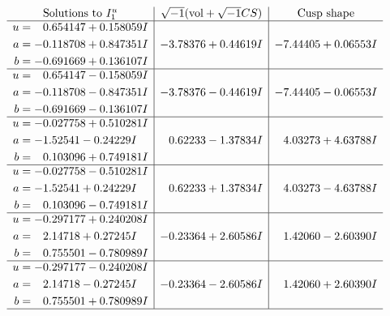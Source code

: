 \documentclass[1p]{elsarticle_modified}
\theoremstyle{definition}
\newcommand{\I}{\sqrt{-1}}
\begin{document}
$$\begin{array}{c|c|c}
\text{Solutions to }I^u_{1}& \I (\text{vol} + \sqrt{-1}CS) & \text{Cusp shape}\\
 \hline 
\begin{aligned}
u &= \phantom{-}0.654147 + 0.158059 I \\
a &= -0.118708 + 0.847351 I \\
b &= -0.691669 + 0.136107 I\end{aligned}
 & -3.78376 + 0.44619 I & -7.44405 + 0.06553 I \\ \hline\begin{aligned}
u &= \phantom{-}0.654147 - 0.158059 I \\
a &= -0.118708 - 0.847351 I \\
b &= -0.691669 - 0.136107 I\end{aligned}
 & -3.78376 - 0.44619 I & -7.44405 - 0.06553 I \\ \hline\begin{aligned}
u &= -0.027758 + 0.510281 I \\
a &= -1.52541 - 0.24229 I \\
b &= \phantom{-}0.103096 + 0.749181 I\end{aligned}
 & \phantom{-}0.62233 - 1.37834 I & \phantom{-}4.03273 + 4.63788 I \\ \hline\begin{aligned}
u &= -0.027758 - 0.510281 I \\
a &= -1.52541 + 0.24229 I \\
b &= \phantom{-}0.103096 - 0.749181 I\end{aligned}
 & \phantom{-}0.62233 + 1.37834 I & \phantom{-}4.03273 - 4.63788 I \\ \hline\begin{aligned}
u &= -0.297177 + 0.240208 I \\
a &= \phantom{-}2.14718 + 0.27245 I \\
b &= \phantom{-}0.755501 - 0.780989 I\end{aligned}
 & -0.23364 + 2.60586 I & \phantom{-}1.42060 - 2.60390 I \\ \hline\begin{aligned}
u &= -0.297177 - 0.240208 I \\
a &= \phantom{-}2.14718 - 0.27245 I \\
b &= \phantom{-}0.755501 + 0.780989 I\end{aligned}
 & -0.23364 - 2.60586 I & \phantom{-}1.42060 + 2.60390 I\\
 \hline 
 \end{array}$$\newpage\newpage\renewcommand{\arraystretch}{1}
\end{document}
